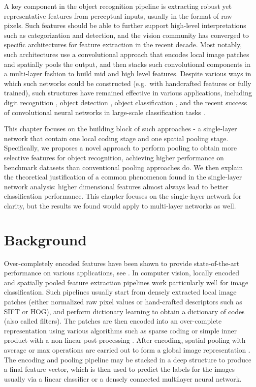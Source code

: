 
A key component in the object recognition pipeline is extracting robust yet representative features from perceptual inputs, usually in the format of raw pixels. Such features should be able to further support high-level interpretations such as categorization and detection, and the vision community has converged to specific architectures for feature extraction in the recent decade. Most notably, such architectures use a convolutional approach that encodes local image patches and spatially pools the output, and then stacks such convolutional components in a multi-layer fashion to build mid and high level features. Despite various ways in which such networks could be constructed (e.g.\ with handcrafted features or fully trained), such structures have remained effective in various applications, including digit recognition \cite{lecun1998gradient}, object detection \cite{Dalal:2005to}, object classification \cite{Yang:2009vb}, and the recent success of convolutional neural networks in large-scale classification tasks \cite{krizhevsky2012imagenet}.

This chapter focuses on the building block of such approaches - a single-layer network that contain one local coding stage and one spatial pooling stage. Specifically, we proposes a novel approach to perform pooling to obtain more selective features for object recognition, achieving higher performance on benchmark datasets than conventional pooling approaches do. We then explain the theoretical justification of a common phenomenon found in the single-layer network analysis: higher dimensional features almost always lead to better classification performance. This chapter focuses on the single-layer network for clarity, but the results we found would apply to multi-layer networks as well.

\section{Background}

Over-completely encoded features have been shown to provide state-of-the-art performance on various applications, see \eg \cite{Olshausen:1997uh,lin2011large,yang2009linear,coates2010aistats}. In computer vision, locally encoded and spatially pooled feature extraction pipelines work particularly well for image classification. Such pipelines usually start from densely extracted local image patches (either normalized raw pixel values or hand-crafted descriptors such as SIFT or HOG), and perform dictionary learning to obtain a dictionary of codes (also called filters). The patches are then encoded into an over-complete representation using various algorithms such as sparse coding \cite{Olshausen:1997uh,wang2010locality} or simple inner product with a non-linear post-processing \cite{coates2011icml,krizhevsky2012imagenet}. After encoding, spatial pooling with average or max operations are carried out to form a global image representation \cite{Yang:2009vb,Boureau:uq}. The encoding and pooling pipeline may be stacked in a deep structure to produce a final feature vector, which is then used to predict the labels for the images usually via a linear classifier or a densely connected multilayer neural network.

